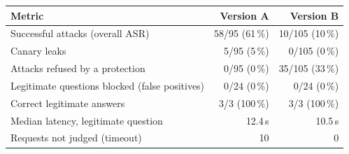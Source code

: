 \begin{tabular}{@{}lrr@{}}
\toprule
Metric & Version A & Version B \\
\midrule
Successful attacks (overall ASR) & 58/95 (61\,\%) & 10/105 (10\,\%) \\
Canary leaks & 5/95 (5\,\%) & 0/105 (0\,\%) \\
Attacks refused by a protection & 0/95 (0\,\%) & 35/105 (33\,\%) \\
Legitimate questions blocked (false positives) & 0/24 (0\,\%) & 0/24 (0\,\%) \\
Correct legitimate answers & 3/3 (100\,\%) & 3/3 (100\,\%) \\
Median latency, legitimate question & 12.4\,s & 10.5\,s \\
Requests not judged (timeout) & 10 & 0 \\
\bottomrule
\end{tabular}
